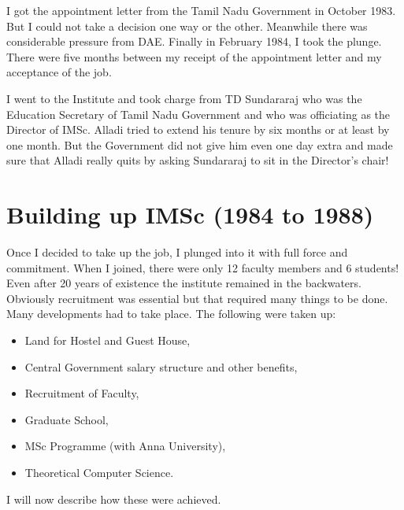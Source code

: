 I got the appointment letter from the Tamil Nadu Government in October 
1983. But I could not take a decision one way or the other. Meanwhile 
there was considerable pressure from DAE. Finally in February 1984, I 
took the plunge. There were five months between my receipt of the 
appointment letter and my acceptance of the job.

I went to the Institute and took charge from TD Sundararaj who was the 
Education Secretary of Tamil Nadu Government and who was officiating as 
the Director of IMSc. Alladi tried to extend his tenure by six months or 
at least by one month. But the Government did not give him even one day 
extra and made sure that Alladi really quits by asking Sundararaj to sit 
in the Director's chair!


\vspace{-.3cm}

\section*{Building up IMSc (1984 to 1988)}

\vspace{-.2cm}

Once I decided to take up the job, I plunged into it with full force and 
commitment. When I joined, there were only 12 faculty members and 6 
students! Even after 20 years of existence the institute remained in the 
backwaters. Obviously recruitment was essential but that required many 
things to be done. Many develop\-ments had to take place. The following 
were taken up:

\begin{itemize}
\itemsep=0pt
\item Land for Hostel and Guest House, 
\item Central Government salary structure and other benefits, 
\item Recruitment of Faculty, 
\item Graduate School, 
\item MSc Programme (with Anna University), 
\item Theoretical Computer Science.
\end{itemize}

I will now describe how these were achieved. 

